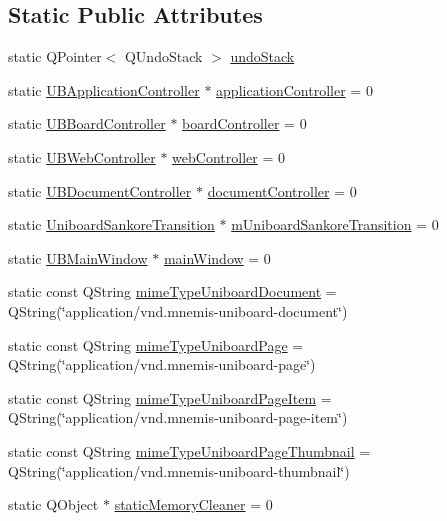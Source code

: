 \subsection*{Static Public Attributes}
\begin{DoxyCompactItemize}
\item 
static Q\-Pointer$<$ Q\-Undo\-Stack $>$ \hyperlink{class_u_b_application_a94e54cea75617b63d6cf97612430a77d}{undo\-Stack}
\item 
static \hyperlink{class_u_b_application_controller}{U\-B\-Application\-Controller} $\ast$ \hyperlink{class_u_b_application_a9ef16693fe3a6bf576b1e86c8fead18e}{application\-Controller} = 0
\item 
static \hyperlink{class_u_b_board_controller}{U\-B\-Board\-Controller} $\ast$ \hyperlink{class_u_b_application_a34aa9a6616b61208ada7ff5fb228e5ff}{board\-Controller} = 0
\item 
static \hyperlink{class_u_b_web_controller}{U\-B\-Web\-Controller} $\ast$ \hyperlink{class_u_b_application_a69b7fb1f61b12d6d98ea689e4073d809}{web\-Controller} = 0
\item 
static \hyperlink{class_u_b_document_controller}{U\-B\-Document\-Controller} $\ast$ \hyperlink{class_u_b_application_a88b0c1b5b98707cc71dae42c5fbcae56}{document\-Controller} = 0
\item 
static \hyperlink{class_uniboard_sankore_transition}{Uniboard\-Sankore\-Transition} $\ast$ \hyperlink{class_u_b_application_afa55ba32705fabaf0fd57d8b669ef552}{m\-Uniboard\-Sankore\-Transition} = 0
\item 
static \hyperlink{class_u_b_main_window}{U\-B\-Main\-Window} $\ast$ \hyperlink{class_u_b_application_a369dfaccbdf3a0089ca67f093a7fd31d}{main\-Window} = 0
\item 
static const Q\-String \hyperlink{class_u_b_application_a7f637d41fcccf67064e478b4f5ecc67e}{mime\-Type\-Uniboard\-Document} = Q\-String(\char`\"{}application/vnd.\-mnemis-\/uniboard-\/document\char`\"{})
\item 
static const Q\-String \hyperlink{class_u_b_application_ad4f533c7971ce1c441b13a1b61e17525}{mime\-Type\-Uniboard\-Page} = Q\-String(\char`\"{}application/vnd.\-mnemis-\/uniboard-\/page\char`\"{})
\item 
static const Q\-String \hyperlink{class_u_b_application_a14d60a2d3e62d98177cada4c13149926}{mime\-Type\-Uniboard\-Page\-Item} = Q\-String(\char`\"{}application/vnd.\-mnemis-\/uniboard-\/page-\/item\char`\"{})
\item 
static const Q\-String \hyperlink{class_u_b_application_a54fdf1ac617534985723e5d3db992f74}{mime\-Type\-Uniboard\-Page\-Thumbnail} = Q\-String(\char`\"{}application/vnd.\-mnemis-\/uniboard-\/thumbnail\char`\"{})
\item 
static Q\-Object $\ast$ \hyperlink{class_u_b_application_af72d66aadc04a5b23e8ca42c0944273a}{static\-Memory\-Cleaner} = 0
\end{DoxyCompactItemize}

